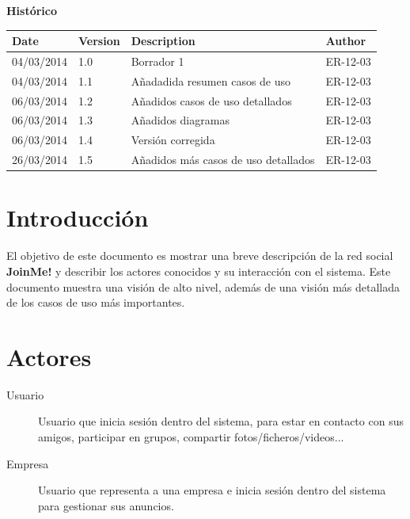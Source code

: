 \documentclass[12pt, a4paper, titlepage]{article}
\begin{document}
\begin{titlepage}
\vspace{2cm}
\begin{center}
	\large{\textbf{Histórico}}
	
    \begin{tabular}{ | p{4cm} | p{2cm} | p{5cm} | p{4cm} |}
    \hline
    \textbf{Date} & \textbf{Version} & \textbf{Description} & \textbf{Author} \\ \hline
    04/03/2014 & 1.0 & Borrador 1  & ER-12-03  \\ \hline
     04/03/2014 & 1.1 & Añadadida resumen casos de uso & ER-12-03  \\ \hline
     06/03/2014 & 1.2 & Añadidos casos de uso detallados & ER-12-03  \\ \hline
     06/03/2014 & 1.3 & Añadidos diagramas & ER-12-03  \\ \hline
     06/03/2014 & 1.4 & Versión corregida & ER-12-03  \\ \hline
     26/03/2014 & 1.5 & Añadidos más casos de uso detallados & ER-12-03 \\ \hline
    \end{tabular}
\end{center}

\end{titlepage}
\clearpage


\tableofcontents
\clearpage

\section{Introducción}

El objetivo de este documento es mostrar una breve descripción de la red social \textbf{JoinMe!} y describir los actores conocidos y su interacción con el sistema.
Este documento muestra una visión de alto nivel, además de una visión más detallada de los casos de uso más importantes.

\section{Actores}
\begin{description}

\item [Usuario] Usuario que inicia sesión dentro del sistema, para estar en contacto con sus amigos, participar en grupos, compartir fotos/ficheros/videos...

\item [Empresa] Usuario que representa a una empresa e inicia sesión dentro del sistema para gestionar sus anuncios.

\end{description}
\end{document}
